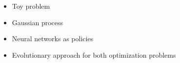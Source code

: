 \begin{itemize}
  \item{Toy problem}
  \item{Gaussian process}
  \item{Neural networks as policies}
  \item{Evolutionary approach for both optimization problems}
\end{itemize}
